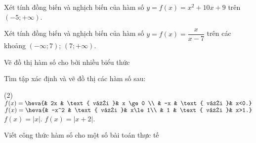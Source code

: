 \begin{vd}
	Xét tính đồng biến và nghịch biến của hàm số $y=f(x)=x^2+10x+9$ trên $(-5;+\infty)$.
		\loigiai{}
\end{vd}

\begin{vd}
	Xét tính đồng biến và nghịch biến của hàm số $y=f(x)=\dfrac{x}{x-7}$ trên các khoảng $(-\infty;7)$;  $(7;+\infty)$.
		\loigiai{}
\end{vd}

\begin{dang}{Vẽ đồ thị hàm số cho bởi nhiều biểu thức}
	
\end{dang}
\begin{vd}
	Tìm tập xác định và vẽ đồ thị các hàm số sau:
	\begin{tasks}(2)
		\task $f(x)=\heva{& 2x & \text{ với }& x \ge 0 \\ & -x & \text{ với }& x<0.}$
		\task $f(x)=\heva{& -x^2 & \text{ với }& x\le 1\\ & 1 & \text{ với }& x>1.}$
		\task $f(x)= \big|x\big|$.
		\task $f(x)= \big|x+2\big|$.
	\end{tasks}
	\loigiai{}
\end{vd}


\begin{dang}{Viết công thức hàm số cho một số bài toán thực tế}
\end{dang}

